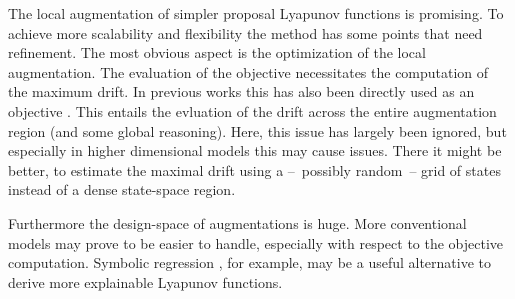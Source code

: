 The local augmentation of simpler proposal Lyapunov functions is promising.
To achieve more scalability and flexibility the method has some points that need refinement.
The most obvious aspect is the optimization of the local augmentation.
The evaluation of the objective necessitates the computation of the maximum drift.
In previous works this has also been directly used as an objective \parencite{milias2014optimization}.
This entails the evluation of the drift across the entire augmentation region (and some global reasoning).
Here, this issue has largely been ignored, but especially in higher dimensional models this may cause issues.
There it might be better, to estimate the maximal drift using a --~possibly random~-- grid of states instead of a dense state-space region.

Furthermore the design-space of augmentations is huge.
More conventional models may prove to be easier to handle, especially with respect to the objective computation.
Symbolic regression \parencite{pysr}, for example, may be a useful alternative to derive more explainable Lyapunov functions.


